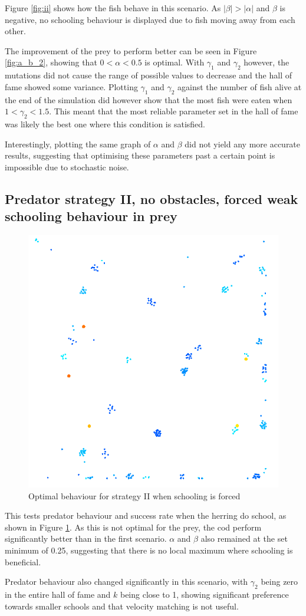 \documentclass[12pt]{article}
\begin{document}
Figure \ref{fig:ii} shows how the fish behave in this scenario. As $|\beta|>|\alpha|$ and $\beta$ is negative, no schooling behaviour is displayed due to fish moving away from each other. \par
The improvement of the prey to perform better can be seen in Figure \ref{fig:a_b_2}, showing  that $0<\alpha<0.5$ is optimal. With $\gamma_1$ and $\gamma_2$ however, the mutations did not cause the range of possible values to decrease and the hall of fame showed some variance. Plotting $\gamma_1$ and $\gamma_2$ against the number of fish alive at the end of the simulation did however show that the most fish were eaten when $1<\gamma_2<1.5$. This meant that the most reliable parameter set in the hall of fame was likely the best one where this condition is satisfied.\par
Interestingly, plotting the same graph of $\alpha$ and $\beta$ did not yield any more accurate results, suggesting that optimising these parameters past a certain point is impossible due to stochastic noise.
\subsection{Predator strategy II, no obstacles, forced weak schooling behaviour in prey}
\begin{figure}[H]
    \centering
    \includegraphics[width=0.5\linewidth]{fig/ii_forced.png}
    \caption{Optimal behaviour for strategy II when schooling is forced}
    \label{fig:2_forced_school}
\end{figure}
This tests predator behaviour and success rate when the herring do school, as shown in Figure \ref{fig:2_forced_school}. As this is not optimal for the prey, the cod perform significantly better than in the first scenario. $\alpha$ and $\beta$ also remained at the set minimum of 0.25, suggesting that there is no local maximum where schooling is beneficial.\par
Predator behaviour also changed significantly in this scenario, with $\gamma_2$ being zero in the entire hall of fame and $k$ being close to 1, showing significant preference towards smaller schools and that velocity matching is not useful.\par
\end{document}

